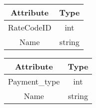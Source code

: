 \begin{center}
  \begin{tabular}{ | c | c | }
    \hline
    \textbf{Attribute} & \textbf{Type} \\ \hline
		RateCodeID & int \\ \hline
		Name & string \\ \hline
  \end{tabular}
\end{center}
\label{tbl:append_nyc_ratecode}

\begin{center}
  \begin{tabular}{ | c | c | }
    \hline
    \textbf{Attribute} & \textbf{Type} \\ \hline
		Payment\_type & int \\ \hline
		Name & string \\ \hline
  \end{tabular}
\end{center}
\label{tbl:append_nyc_payment}
